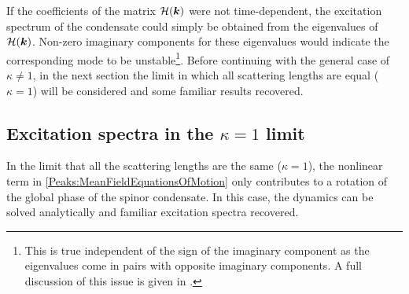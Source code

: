 If the coefficients of the matrix $\mathcal{H}(\bm{k})$ were not time-dependent, the excitation spectrum of the condensate could simply be obtained from the eigenvalues of $\mathcal{H}(\bm{k})$. Non-zero imaginary components for these eigenvalues would indicate the corresponding mode to be unstable\footnote{This is true independent of the sign of the imaginary component as the eigenvalues come in pairs with opposite imaginary components. A full discussion of this issue is given in .}. Before continuing with the general case of $\kappa \neq 1$, in the next section the limit in which all scattering lengths are equal ($\kappa=1$) will be considered and some familiar results recovered.

\subsection{Excitation spectra in the $\kappa = 1$ limit}
\label{Peaks:Kappa1Limit}
In the limit that all the scattering lengths are the same ($\kappa = 1$), the nonlinear term in \eqref{Peaks:MeanFieldEquationsOfMotion} only contributes to a rotation of the global phase of the spinor condensate. In this case, the dynamics can be solved analytically and familiar excitation spectra recovered.

